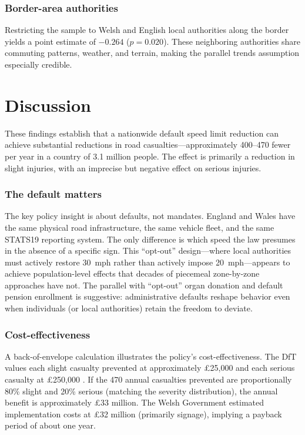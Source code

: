 \documentclass[12pt]{article}
\begin{document}
\subsubsection*{Border-area authorities} Restricting the sample to Welsh and English local authorities along the border yields a point estimate of $-0.264$ ($p = 0.020$). These neighboring authorities share commuting patterns, weather, and terrain, making the parallel trends assumption especially credible.

\section{Discussion}
\label{sec:discussion}

These findings establish that a nationwide default speed limit reduction can achieve substantial reductions in road casualties---approximately 400--470 fewer per year in a country of 3.1 million people. The effect is primarily a reduction in slight injuries, with an imprecise but negative effect on serious injuries.

\subsubsection*{The default matters} The key policy insight is about defaults, not mandates. England and Wales have the same physical road infrastructure, the same vehicle fleet, and the same STATS19 reporting system. The only difference is which speed the law presumes in the absence of a specific sign. This ``opt-out'' design---where local authorities must actively restore 30~mph rather than actively impose 20~mph---appears to achieve population-level effects that decades of piecemeal zone-by-zone approaches have not. The parallel with ``opt-out'' organ donation \citep{anderson2014} and default pension enrollment is suggestive: administrative defaults reshape behavior even when individuals (or local authorities) retain the freedom to deviate.

\subsubsection*{Cost-effectiveness} A back-of-envelope calculation illustrates the policy's cost-effectiveness. The DfT values each slight casualty prevented at approximately \pounds{}25,000 and each serious casualty at \pounds{}250,000 \citep{dft2024}. If the 470 annual casualties prevented are proportionally 80\% slight and 20\% serious (matching the severity distribution), the annual benefit is approximately \pounds{}33 million. The Welsh Government estimated implementation costs at \pounds{}32 million (primarily signage), implying a payback period of about one year.
\end{document}
